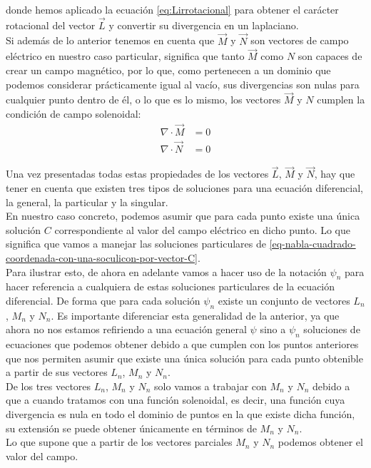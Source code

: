 \noindent
donde hemos aplicado la ecuación \eqref{eq:Lirrotacional} para obtener el carácter rotacional del vector $\vec{L}$ y convertir su divergencia en un laplaciano.\\

Si además de lo anterior tenemos en cuenta que $\vec{M}$ y $\vec{N}$ son vectores de campo eléctrico en nuestro caso particular, significa que tanto $\vec{M}$ como $N$ son capaces de crear un campo magnético, por lo que, como pertenecen a un dominio que podemos considerar prácticamente igual al vacío, sus divergencias son nulas para cualquier punto dentro de él, o lo que es lo mismo, los vectores $\vec{M}$ y $N$ cumplen la condición de campo solenoidal:
\begin{align}
    \nabla\cdot \vec{M} &= 0
    \label{M-cumplen-ser-campo-solenoidal}\\
    \nabla\cdot \vec{N} &= 0
    \label{N-cumplen-ser-campo-solenoidal}
\end{align}

\newpage

Una vez presentadas todas estas propiedades de los vectores $\vec{L}$, $\vec{M}$ y $\vec{N}$, hay que tener en cuenta que existen tres tipos de soluciones para una ecuación diferencial, la general, la particular y la singular.\\
En nuestro caso concreto, podemos asumir que para cada punto existe una única solución $C$ correspondiente al valor del campo eléctrico en dicho punto. Lo que significa que vamos a manejar las soluciones particulares de \eqref{eq-nabla-cuadrado-coordenada-con-una-soculicon-por-vector-C}.\\

Para ilustrar esto, de ahora en adelante vamos a hacer uso de la notación $\psi_{n}$ para hacer referencia a cualquiera de estas soluciones particulares de la ecuación diferencial. De forma que para cada solución $\psi_{n}$ existe un conjunto de vectores $L_{n}$, $M_{n}$ y $N_{n}$. Es importante diferenciar esta generalidad de la anterior, ya que ahora no nos estamos refiriendo a una ecuación general $\psi$ sino a $\psi_{n}$ soluciones de ecuaciones que podemos obtener debido a que cumplen con los puntos anteriores que nos permiten asumir que existe una única solución para cada punto obtenible a partir de sus vectores $L_{n}$, $M_{n}$ y $N_{n}$.
\\

De los tres vectores $L_{n}$, $M_{n}$ y $N_{n}$ solo vamos a trabajar con $M_{n}$ y $N_{n}$ debido a que a cuando tratamos con una función solenoidal, es decir, una función cuya divergencia es nula en todo el dominio de puntos en la que existe dicha función, su extensión se puede obtener únicamente en términos de  $M_{n}$ y $N_{n}$.\\
Lo que supone que a partir de los vectores parciales $M_{n}$ y $N_{n}$ podemos obtener el valor del campo.\\

